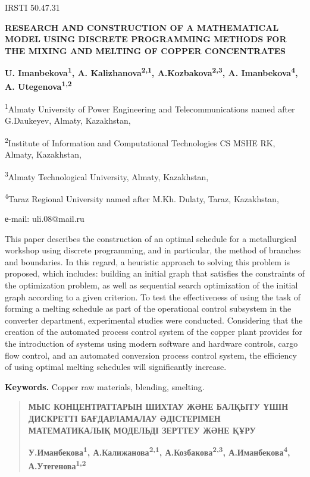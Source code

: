 IRSTI 50.47.31

{\bfseries RESEARCH AND CONSTRUCTION OF A MATHEMATICAL MODEL USING DISCRETE
PROGRAMMING METHODS FOR THE MIXING AND MELTING OF COPPER CONCENTRATES}

{\bfseries U. Imanbekova\textsuperscript{1}, A.
Kalizhanova\textsuperscript{2,1}, A.Kozbakova\textsuperscript{2,3}, A.
Imanbekova\textsuperscript{4}, A. Utegenova\textsuperscript{1,2}}

\textsuperscript{1}Almaty University of Power Engineering and
Telecommunications named after G.Daukeyev, Almaty, Kazakhstan,

\textsuperscript{2}Institute of Information and Computational
Technologies CS MSHE RK, Almaty, Kazakhstan,

\textsuperscript{3}Almaty Technological University, Almaty, Kazakhstan,

\textsuperscript{4}Taraz Regional University named after M.Kh. Dulaty,
Taraz, Kazakhstan,

е-mail: uli.08@mail.ru

This paper describes the construction of an optimal schedule for a
metallurgical workshop using discrete programming, and in particular,
the method of branches and boundaries. In this regard, a heuristic
approach to solving this problem is proposed, which includes: building
an initial graph that satisfies the constraints of the optimization
problem, as well as sequential search optimization of the initial graph
according to a given criterion. To test the effectiveness of using the
task of forming a melting schedule as part of the operational control
subsystem in the converter department, experimental studies were
conducted. Considering that the creation of the automated process
control system of the copper plant provides for the introduction of
systems using modern software and hardware controls, cargo flow control,
and an automated conversion process control system, the efficiency of
using optimal melting schedules will significantly increase.

{\bfseries Keywords.} Copper raw materials, blending, smelting.

\begin{quote}
{\bfseries МЫС КОНЦЕНТРАТТАРЫН ШИХТАУ ЖӘНЕ БАЛҚЫТУ ҮШІН ДИСКРЕТТІ
БАҒДАРЛАМАЛАУ ӘДІСТЕРІМЕН МАТЕМАТИКАЛЫҚ МОДЕЛЬДІ ЗЕРТТЕУ ЖӘНЕ ҚҰРУ}

{\bfseries У.Иманбекова\textsuperscript{1},
А.Калижанова\textsuperscript{2,1}, А.Козбакова\textsuperscript{2,3},
А.Иманбекова\textsuperscript{4}, А.Утегенова\textsuperscript{1,2}}
\end{quote}

